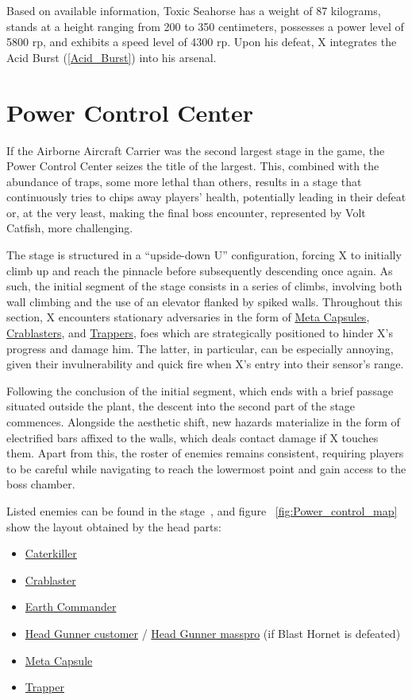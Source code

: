 Based on available information, Toxic Seahorse has a weight of 87 kilograms, stands at a height ranging from 200 to 350 centimeters, possesses a power level of 5800 rp, and exhibits a speed level of 4300 rp. Upon his defeat, X integrates the Acid Burst (\ref{Acid_Burst}) into his arsenal.




\section{Power Control Center}
If the Airborne Aircraft Carrier was the second largest stage in the game, the Power Control Center seizes the title of the largest. This, combined with the abundance of traps, some more lethal than others, results in a stage that continuously tries to chips away players' health, potentially leading in their defeat or, at the very least, making the final boss encounter, represented by Volt Catfish, more challenging.

The stage is structured in a ``upside-down U'' configuration, forcing X to initially climb up and reach the pinnacle before subsequently descending once again. As such, the initial segment of the stage consists in a series of climbs, involving both wall climbing and the use of an elevator flanked by spiked walls. Throughout this section, X encounters stationary adversaries in the form of \hyperlink{enem:Meta_Capsule}{Meta Capsules}, \hyperlink{enem:Crablaster}{Crablasters}, and \hyperlink{enem:Trapper}{Trappers}, foes which are strategically positioned to hinder X's progress and damage him. The latter, in particular, can be especially annoying, given their invulnerability and quick fire when X's entry into their sensor's range.

Following the conclusion of the initial segment, which ends with a brief passage situated outside the plant, the descent into the second part of the stage commences. Alongside the aesthetic  shift, new hazards materialize in the form of electrified bars affixed to the walls, which deals contact damage if X touches them. Apart from this, the roster of enemies remains consistent, requiring players to be careful while navigating to reach the lowermost point and gain access to the boss chamber.

Listed enemies can be found in the stage~\cite{wiki:Power_control}, and figure ~\ref{fig:Power_control_map} show the layout obtained by the head parts:
\begin{itemize}
	\item \hyperlink{enem:Caterkiller}{Caterkiller}
	\item \hyperlink{enem:Crablaster}{Crablaster}
	\item \hyperlink{enem:Earth_Commander}{Earth Commander}
	\item \hyperlink{enem:Head_Gunner_customer}{Head Gunner customer} / \hyperlink{enem:Head_Gunner_masspro}{Head Gunner masspro} (if Blast Hornet is defeated) 
	\item \hyperlink{enem:Meta_Capsule}{Meta Capsule}
	\item \hyperlink{enem:Trapper}{Trapper}
\end{itemize}

